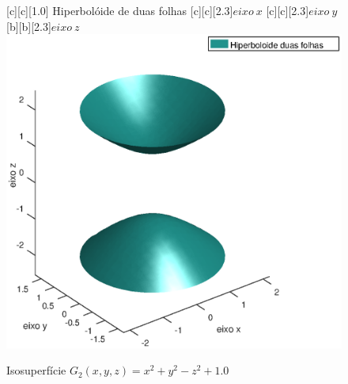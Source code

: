 \begin{figure}[htpb]
\begin{center} 
[c][c][1.0]{\hspace{0.25cm} Hiperbolóide de duas folhas}
[c][c][2.3]{$eixo \ x$}
[c][c][2.3]{$eixo \ y$}
[b][b][2.3]{$eixo \ z$}
\includegraphics*[angle=0,scale=0.5]{imagens/cap2/hipduasfolhas.eps} 
\caption{Isosuperfície $G_2(x,y,z)=x^2+y^2-z^2+1.0$} 
\label{fig.hipduasfolhas}
\end{center}
\end{figure}







